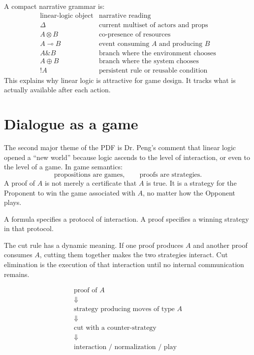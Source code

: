 A compact narrative grammar is:
\[
\begin{array}{c|c}
\text{linear-logic object} & \text{narrative reading}\\
\hline
\Delta & \text{current multiset of actors and props}\\
A\otimes B & \text{co-presence of resources}\\
A\multimap B & \text{event consuming \(A\) and producing \(B\)}\\
A\& B & \text{branch where the environment chooses}\\
A\oplus B & \text{branch where the system chooses}\\
!A & \text{persistent rule or reusable condition}
\end{array}
\]
This explains why linear logic is attractive for game design.  It tracks what is actually available after each action.

\section{Dialogue as a game}

The second major theme of the PDF is Dr. Peng's comment that linear logic opened a ``new world'' because logic ascends to the level of interaction, or even to the level of a game.  In game semantics:
\[
  \text{propositions are games},\qquad
  \text{proofs are strategies}.
\]
A proof of \(A\) is not merely a certificate that \(A\) is true.  It is a strategy for the Proponent to win the game associated with \(A\), no matter how the Opponent plays.

\begin{definition}
A formula specifies a protocol of interaction.  A proof specifies a winning strategy in that protocol.
\end{definition}

The cut rule has a dynamic meaning.  If one proof produces \(A\) and another proof consumes \(A\), cutting them together makes the two strategies interact.  Cut elimination is the execution of that interaction until no internal communication remains.

\[
\begin{array}{c}
\text{proof of }A\\
\Downarrow\\
\text{strategy producing moves of type }A\\
\Downarrow\\
\text{cut with a counter-strategy}\\
\Downarrow\\
\text{interaction / normalization / play}
\end{array}
\]

